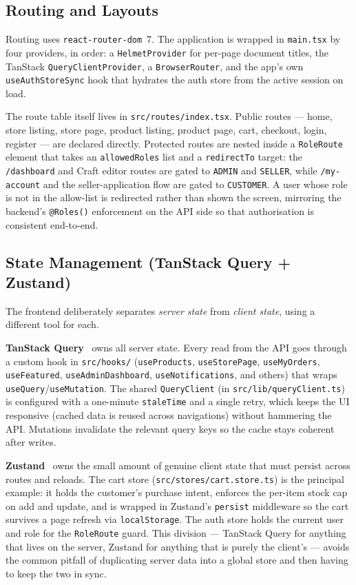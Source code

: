 \documentclass[12pt, a4paper, oneside]{report}
\begin{document}
\subsection{Routing and Layouts}

Routing uses \texttt{react-router-dom}~7. The application is wrapped
in \texttt{main.tsx} by four providers, in order: a
\texttt{HelmetProvider} for per-page document titles, the TanStack
\texttt{QueryClientProvider}, a \texttt{BrowserRouter}, and the app's
own \texttt{useAuthStoreSync} hook that hydrates the auth store from
the active session on load.

The route table itself lives in \texttt{src/routes/index.tsx}. Public
routes --- home, store listing, store page, product listing, product
page, cart, checkout, login, register --- are declared directly.
Protected routes are nested inside a \texttt{RoleRoute} element that
takes an \texttt{allowedRoles} list and a \texttt{redirectTo} target:
the \texttt{/dashboard} and Craft editor routes are gated to
\texttt{ADMIN} and \texttt{SELLER}, while \texttt{/my-account} and the
seller-application flow are gated to \texttt{CUSTOMER}. A user whose
role is not in the allow-list is redirected rather than shown the
screen, mirroring the backend's \texttt{@Roles()} enforcement on the
API side so that authorisation is consistent end-to-end.

\subsection{State Management (TanStack Query + Zustand)}

The frontend deliberately separates \emph{server state} from
\emph{client state}, using a different tool for each.

\textbf{TanStack Query}~\cite{tanstack} owns all server state. Every read from the
API goes through a custom hook in \texttt{src/hooks/}
(\texttt{useProducts}, \texttt{useStorePage}, \texttt{useMyOrders},
\texttt{useFeatured}, \texttt{useAdminDashboard},
\texttt{useNotifications}, and others) that wraps
\texttt{useQuery}/\texttt{useMutation}. The shared
\texttt{QueryClient} (in \texttt{src/lib/queryClient.ts}) is
configured with a one-minute \texttt{staleTime} and a single retry,
which keeps the UI responsive (cached data is reused across
navigations) without hammering the API. Mutations invalidate the
relevant query keys so the cache stays coherent after writes.

\textbf{Zustand}~\cite{zustand} owns the small amount of genuine client state that
must persist across routes and reloads. The cart store
(\texttt{src/stores/cart.store.ts}) is the principal example: it holds
the customer's purchase intent, enforces the per-item stock cap on
add and update, and is wrapped in Zustand's \texttt{persist}
middleware so the cart survives a page refresh via
\texttt{localStorage}. The auth store holds the current user and role
for the \texttt{RoleRoute} guard. This division --- TanStack Query for
anything that lives on the server, Zustand for anything that is purely
the client's --- avoids the common pitfall of duplicating server data
into a global store and then having to keep the two in sync.
\end{document}
